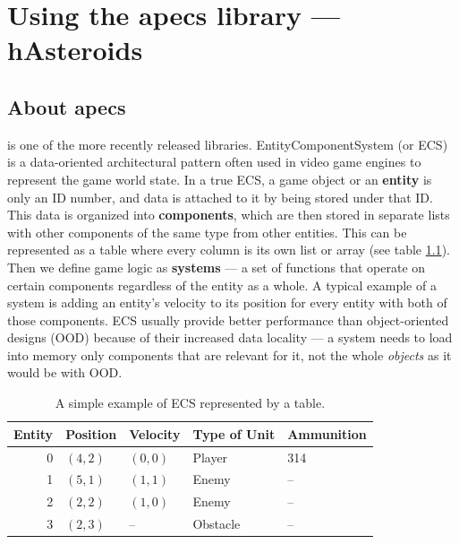 \documentclass[
  digital, %
  color,   %
  table,   %
  oneside, %
  lof,     %
  lot,     %
]{fithesis3}
\begin{document}
\chapter{Using the apecs library --- hAsteroids}
\label{chptr:hasteroids}

\section{About apecs}
\label{sect:apecs}
\cite{apecsrepo}
is one of the more recently released libraries.
Entity\textendash{}Component\textendash{}System (or ECS) is a data-oriented architectural pattern often
used in video game engines to represent the game world state.
In a true ECS, a game object or an \textbf{entity} is only an ID number,
and data is attached to it by being stored under that ID. This data is
organized into \textbf{components}, which are then stored in separate
lists with other components of the same type from other entities.\cite{mediumecs} This can
be represented as a table where every column is its own list or array
(see table \ref{tab:ecsexamp}). Then we define game logic as \textbf{systems}
--- a set of functions that operate on certain components regardless of the
entity as a whole. A typical example of a system is adding an entity's velocity
to its position for every entity with both of those components.
ECS usually provide better performance than object-oriented designs (OOD)
because of their increased data locality --- a system needs to load into memory
only components that are relevant for it, not the whole \emph{objects}
as it would be with OOD.\cite{apecspaper}
\begin{table}[htp]
  \begin{tabularx}{320pt}{|r|lllX|}
    \toprule
    Entity & Position & Velocity & Type of Unit & Ammunition \\
    \midrule
    0 & $(4,2)$ & $(0,0)$ & Player   & 314\\
    1 & $(5,1)$ & $(1,1)$ & Enemy    & -- \\
    2 & $(2,2)$ & $(1,0)$ & Enemy    & -- \\
    3 & $(2,3)$ & --      & Obstacle & -- \\
    \bottomrule
  \end{tabularx}
  \caption{A simple example of ECS represented by a table.}
  \label{tab:ecsexamp}
\end{table}
\end{document}
